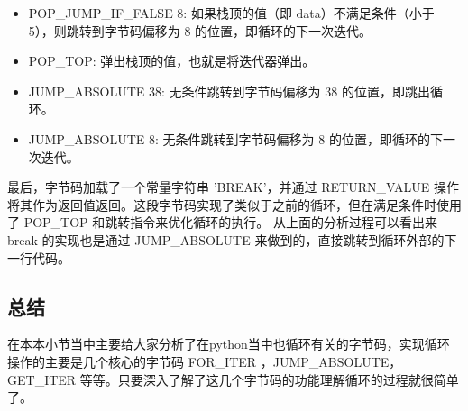 \begin{itemize}
\item POP\_JUMP\_IF\_FALSE 8: 如果栈顶的值（即 data）不满足条件（小于 5），则跳转到字节码偏移为 8 的位置，即循环的下一次迭代。 
\item POP\_TOP: 弹出栈顶的值，也就是将迭代器弹出。 
\item JUMP\_ABSOLUTE 38: 无条件跳转到字节码偏移为 38 的位置，即跳出循环。 
\item JUMP\_ABSOLUTE 8: 无条件跳转到字节码偏移为 8 的位置，即循环的下一次迭代。 
\end{itemize}
最后，字节码加载了一个常量字符串 'BREAK'，并通过 RETURN\_VALUE 操作将其作为返回值返回。这段字节码实现了类似于之前的循环，但在满足条件时使用了 POP\_TOP 和跳转指令来优化循环的执行。
从上面的分析过程可以看出来 break 的实现也是通过 JUMP\_ABSOLUTE 来做到的，直接跳转到循环外部的下一行代码。
\subsection{总结}
在本本小节当中主要给大家分析了在python当中也循环有关的字节码，实现循环操作的主要是几个核心的字节码 FOR\_ITER ，JUMP\_ABSOLUTE，GET\_ITER 等等。只要深入了解了这几个字节码的功能理解循环的过程就很简单了。

